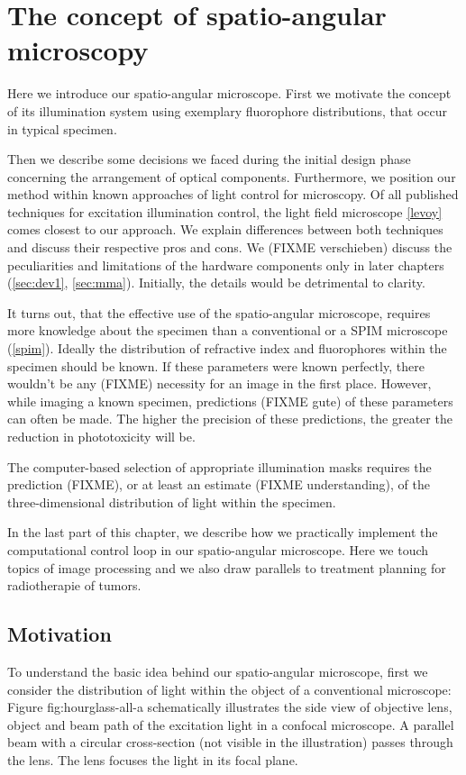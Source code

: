 \chapter{The concept of spatio-angular microscopy}
\label{sec:concept}
\begin{summary}
  Here we introduce our spatio-angular microscope. First we motivate
  the concept of its illumination system using exemplary fluorophore
  distributions, that occur in typical specimen.

  Then we describe some decisions we faced during the initial design
  phase concerning the arrangement of optical components. Furthermore,
  we position our method within known approaches of light control for
  microscopy. Of all published techniques for excitation illumination
  control, the light field microscope \ref{levoy} comes closest to our
  approach.  We explain differences between both techniques and
  discuss their respective pros and cons.  We (FIXME verschieben)
  discuss the peculiarities and limitations of the hardware components
  only in later chapters (\ref{sec:dev1}, \ref{sec:mma}).  Initially,
  the details would be detrimental to clarity.

  It turns out, that the effective use of the spatio-angular
  microscope, requires more knowledge about the specimen than a
  conventional or a SPIM microscope (\ref{spim}). Ideally the
  distribution of refractive index and fluorophores within the
  specimen should be known. If these parameters were known perfectly,
  there wouldn't be any (FIXME) necessity for an image in the first
  place. However, while imaging a known specimen, predictions (FIXME
  gute) of these parameters can often be made. The higher the
  precision of these predictions, the greater the reduction in
  phototoxicity will be.

  The computer-based selection of appropriate illumination masks
  requires the prediction (FIXME), or at least an estimate (FIXME
  understanding), of the three-dimensional distribution of light within
  the specimen.

  In the last part of this chapter, we describe how we practically
  implement the computational control loop in our spatio-angular
  microscope. Here we touch topics of image processing and we also
  draw parallels to treatment planning for radiotherapie of tumors.
\end{summary}
\section{Motivation}
To understand the basic idea behind our spatio-angular microscope,
first we consider the distribution of light within the object of a
conventional microscope: Figure fig:hourglass-all-a schematically
illustrates the side view of objective lens, object and beam path of
the excitation light in a confocal microscope. A parallel beam with a
circular cross-section (not visible in the illustration) passes
through the lens. The lens focuses the light in its focal plane.

